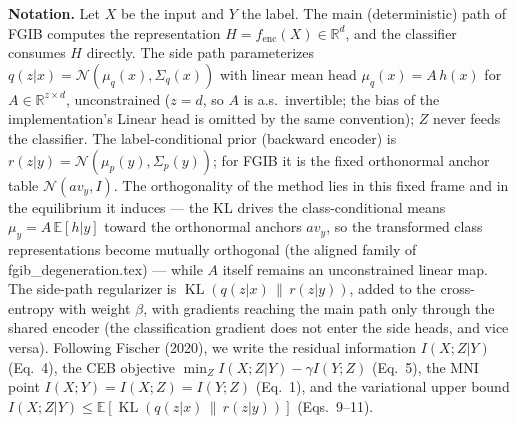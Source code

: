 
\newtheorem{lemma}{Lemma}
\newtheorem{proposition}{Proposition}
\newtheorem{remark}{Remark}

\textbf{Notation.}
Let $X$ be the input and $Y$ the label.
The main (deterministic) path of FGIB computes the representation
$H = f_{\mathrm{enc}}(X) \in \mathbb{R}^{d}$, and the classifier consumes $H$ directly.
The side path parameterizes $q(z|x) = \mathcal{N}(\mu_q(x), \Sigma_q(x))$ with linear mean
head $\mu_q(x) = A\,h(x)$ for $A \in \mathbb{R}^{z \times d}$, unconstrained ($z = d$, so
$A$ is a.s.\ invertible; the bias of the implementation's Linear head is omitted by the
same convention); $Z$ never feeds the classifier.
The label-conditional prior (backward encoder) is $r(z|y) = \mathcal{N}(\mu_p(y), \Sigma_p(y))$;
for FGIB it is the fixed orthonormal anchor table $\mathcal{N}(a v_y, I)$. The
orthogonality of the method lies in this fixed frame and in the equilibrium it induces
--- the KL drives the class-conditional means $\mu_y = A\,\mathbb{E}[h|y]$ toward the
orthonormal anchors $a v_y$, so the transformed class representations become mutually
orthogonal (the aligned family of fgib\_degeneration.tex) --- while $A$ itself remains
an unconstrained linear map.
The side-path regularizer is $\operatorname{KL}(q(z|x)\,\|\,r(z|y))$, added to the
cross-entropy with weight $\beta$, with gradients reaching the main path only through the
shared encoder (the classification gradient does not enter the side heads, and vice versa).
Following Fischer (2020), we write the residual information $I(X;Z|Y)$ (Eq.~4), the CEB
objective $\min_Z I(X;Z|Y) - \gamma I(Y;Z)$ (Eq.~5), the MNI point
$I(X;Y) = I(X;Z) = I(Y;Z)$ (Eq.~1), and the variational upper bound
$I(X;Z|Y) \le \mathbb{E}[\operatorname{KL}(q(z|x)\,\|\,r(z|y))]$ (Eqs.~9--11).

